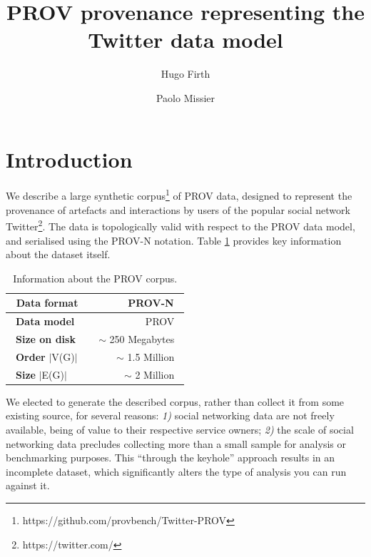 \documentclass{llncs}
\title{PROV provenance representing the Twitter data model}
\author{Hugo Firth \and Paolo Missier}
\institute{School of Computing Science, Newcastle University, UK\\
           \{h.firth, paolo.missier\}@ncl.ac.uk
}
\begin{document}
\maketitle

\section{Introduction}
%
We describe a large synthetic corpus\footnote{https://github.com/provbench/Twitter-PROV} of PROV data, designed to represent the provenance of artefacts and interactions by users of the popular social network Twitter\footnote{https://twitter.com/}.
%
The data is topologically valid with respect to the PROV data model\cite{w3c-prov-dm}, and serialised using the PROV-N notation\cite{w3c-prov-dm}.
%
Table \ref{tab:corpusinformation} provides key information about the dataset itself.
%    
\begin{table}[H]
    \centering
    \caption{Information about the PROV corpus.}
    \label{tab:corpusinformation}
    \begin{tabular}{ | l | r | }
        \hline
        \, \textbf{Data format} \, &\, PROV-N \, \\ \hline
        \, \textbf{Data model} \, &\, PROV \, \\ \hline
        \, \textbf{Size on disk} \, &\, $\sim$ 250 Megabytes \, \\ \hline
        \, \textbf{Order} $\vert$V(G)$\vert$ \, &\, $\sim$ 1.5 Million \, \\ \hline
        \, \textbf{Size} $\vert$E(G)$\vert$ \, &\, $\sim$ 2 Million \, \\ \hline
    \end{tabular}
\end{table}
%
We elected to generate the described corpus, rather than collect it from some existing source, for several reasons:
%
\textit{1)} social networking data are not freely available, being of value to their respective service owners;
%
\textit{2)} the scale of social networking data precludes collecting more than a small sample for analysis or benchmarking purposes.
%
This ``through the keyhole'' approach results in an incomplete dataset, which significantly alters the type of analysis you can run against it.
% 
\end{document}

